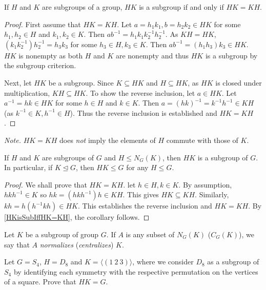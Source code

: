 \begin{theorem}
\label{HKisSubIffHK=KH}
    If $H$ and $K$ are subgroups of a group, $HK$ is a subgroup if and only if $HK=KH$.
\end{theorem}
\begin{proof}
    First assume that $HK=KH$. Let $a=h_1k_1, b=h_2k_2\in HK$ for some $h_1,h_2\in H$ and $k_1,k_2\in K$. Then $ab^{-1}=h_1k_1k_2^{-1}h_2^{-1}$. As $KH=HK$, $(k_1k_2^{-1})h_2^{-1}=h_3k_3$ for some $h_3\in H,k_3\in K$. Then $ab^{-1}=(h_1h_3)k_3\in HK$. $HK$ is nonempty as both $H$ and $K$ are nonempty and thus $HK$ is a subgroup by the subgroup criterion.
    
    Next, let $HK$ be a subgroup. Since $K\subseteq HK$ and $H\subseteq HK$, as $HK$ is closed under multiplication, $KH\subseteq HK$. To show the reverse inclusion, let $a\in HK$. Let $a^{-1}=hk\in HK$ for some $h\in H$ and $k\in K$. Then $a=(hk)^{-1}=k^{-1}h^{-1}\in KH$ (as $k^{-1}\in K, h^{-1}\in H$). Thus the reverse inclusion is established and $HK=KH$.
\end{proof}

\textit{Note.} $HK=KH$ does \textit{not} imply the elements of $H$ commute with those of $K$.

\begin{corollary}
\label{HKSubgroupIfKunlhdG}
    If $H$ and $K$ are subgroups of $G$ and $H\leq N_G(K)$, then $HK$ is a subgroup of $G$. In particular, if $K\unlhd G$, then $HK\leq G$ for any $H\leq G$.
\end{corollary}
\begin{proof}
    We shall prove that $HK=KH$. let $h\in H,k\in K$. By assumption, $hkh^{-1}\in K$ so $hk=(hkh^{-1})h\in KH$. This gives $HK\subseteq KH$. Similarly, $kh=h(h^{-1}kh)\in HK$. This establishes the reverse inclusion and $HK=KH$. By \ref{HKisSubIffHK=KH}, the corollary follows.
\end{proof}

\begin{definition}
    Let $K$ be a subgroup of group $G$. If $A$ is any subset of $N_G(K)$ ($C_G(K)$), we say that $A$ \textit{normalizes} (\textit{centralizes}) $K$.
\end{definition}

\begin{exercise}
    Let $G=S_4$, $H=D_8$ and $K=\langle (1\:2\:3)\rangle$, where we consider $D_8$ as a subgroup of $S_4$ by identifying each symmetry with the respective permutation on the vertices of a square. Prove that $HK=G$.
\end{exercise}

